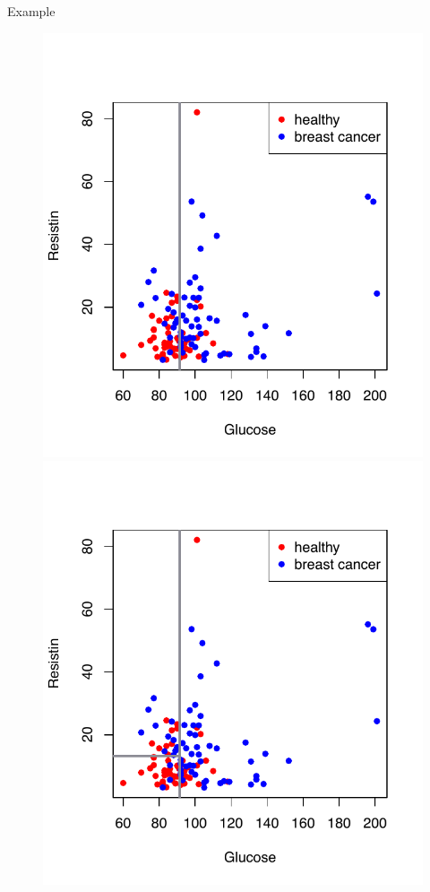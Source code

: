 \documentclass[notes]{beamer}          %
\begin{document}
\begin{frame}{Example}
 \begin{figure}
  \includegraphics[width=\linewidth]{../figures/week_2_classification/breast_cancer_2Dscatterplot_vline.pdf}  
\endminipage\hfill
{}%
  \includegraphics[width=\linewidth]{../figures/week_2_classification/breast_cancer_2Dscatterplot_vhlines.pdf}  
\endminipage
\end{figure}
\end{frame}
\end{document}

